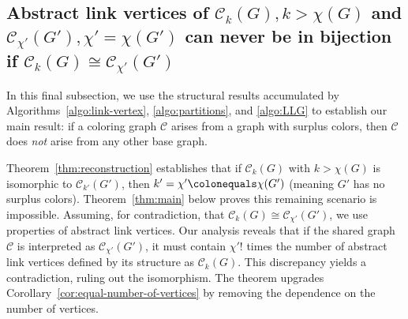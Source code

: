 \documentclass{amsart}
\theoremstyle{hypothesisstyle}
\theoremstyle{definition}
\theoremstyle{remark}
\numberwithin{equation}{section}
\newcommand{\C}{\mathcal C}
\begin{document}
\subsection{\texorpdfstring{Abstract link vertices of $\C_k(G),k>\chi(G)$ and $\C_{\chi'}(G'),\chi'=\chi(G')$ can never be in bijection if $\mathcal C_k(G)\cong \C_{\chi'}(G')$}{Abstract link vertices of C{k}(G),k>chi(G) and C{chi'}(G'),chi'=chi(G') can never be in bijection if C{k}(G)=C{chi'}(G')}}\label{subsect:final}

In this final subsection, we use the structural results accumulated by Algorithms~\ref{algo:link-vertex}, \ref{algo:partitions}, and \ref{algo:LLG} to establish our main result: if a coloring graph $\mathcal{C}$ arises from a graph with surplus colors, then $\mathcal{C}$ does \emph{not} arise from any other base graph. 

Theorem~\ref{thm:reconstruction} establishes that if $\mathcal{C}_k(G)$ with $k>\chi(G)$ is isomorphic to $\mathcal{C}_{k'}(G')$, then $k'=\chi'\colonequals\chi(G')$ (meaning $G'$ has no surplus colors). Theorem~\ref{thm:main} below proves this remaining scenario is impossible. Assuming, for contradiction, that $\mathcal{C}_k(G)\cong \mathcal{C}_{\chi'}(G')$, we use properties of abstract link vertices. Our analysis reveals that if the shared graph $\mathcal{C}$ is interpreted as $\mathcal{C}_{\chi'}(G')$, it must contain $\chi'!$ times the number of abstract link vertices defined by its structure as $\mathcal{C}_{k}(G)$. This discrepancy yields a contradiction, ruling out the isomorphism. The theorem upgrades Corollary~\ref{cor:equal-number-of-vertices} by removing the dependence on the number of vertices.

\medskip 
\end{document}
